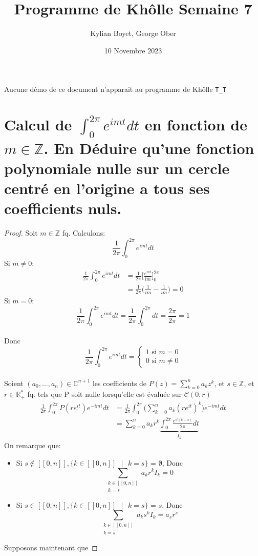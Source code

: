 \documentclass[french]{article}
\title{Programme de Khôlle Semaine 7}
\author{Kylian Boyet, George Ober}
\date{10 Novembre 2023}
\newcommand{\Z}{\mathbb Z}
\newcommand{\C}{\mathbb C}
\newcommand{\R}{\mathbb R}
\begin{document}
\maketitle

Aucune démo de ce document n'apparait au programme de Khôlle \verb|T_T|

\section{Calcul de $\int_0^{2\pi}e^{imt}dt$ en fonction de $m \in \Z$. En Déduire qu'une fonction polynomiale nulle sur un cercle centré en l'origine a tous ses coefficients nuls.}

\begin{proof}
	Soit $m \in \Z$ fq. Calculons:
	$$\frac{1}{2 \pi} \int_0^{2\pi}e^{imt}dt$$
	Si $m \neq 0$:
	\begin{align*}
		\frac{1}{2 \pi} \int_0^{2\pi}e^{imt}dt &= \frac{1}{2 \pi} \Big[ \frac{e^{mt}}{im} \Big]_0^{2\pi}\\
		&= \frac{1}{2 \pi} \Big( \frac{1}{im} - \frac{1}{im} \Big) = 0
	\end{align*}
	Si $m = 0$:
	$$
		\frac{1}{2 \pi} \int_0^{2\pi}e^{imt}dt = \frac{1}{2 \pi} \int_0^{2\pi}dt = \frac{2 \pi}{2 \pi} = 1
	$$
	\\
	Donc $$\frac{1}{2 \pi} \int_0^{2\pi}e^{imt}dt = 
	\begin{cases}
		1 \text{ si } m=0\\
		0 \text{ si } m \neq 0
	\end{cases}
	$$
	\\
	Soient $(a_0, ..., a_n) \in \C^{n+1}$ les coefficients de $P(z) = \sum_{k=0}^n a_k z^k$, et $s\in \Z$, et $r \in \R_+^*$ fq. tels que P soit nulle lorsqu'elle est évaluée sur $\mathscr C(0,r)$
	\begin{align*}
		\frac{1}{2 \pi} \int_0^{2\pi} P(re^{it}) e^{-imt}dt &= \frac{1}{2 \pi} \int_0^{2\pi} \bigg (\sum_{k=0}^n a_k (re^{it})^k \bigg) e^{-imt}dt\\
		&= \sum_{k=0}^n a_k r^k \underbrace{\int_0^{2\pi} \frac{e^{it(k-s)}}{2 \pi} dt}_{I_k}
	\end{align*}
	On remarque que:
	\begin{itemize}
	\item Si $s \notin [[0, n]], \{k \in [[0, n]] \text{ }| \text{ } k = s\}$ = $\emptyset$, Donc $$\sum_{\substack{k \in [[0, n]] \\ k = s}} a_k r^k I_k = 0$$
	\item Si $s \in [[0, n]], \{k \in [[0, n]] \text{ }| \text{ } k = s\}$ = ${s}$, Donc $$\sum_{\substack{k \in [[0, n]] \\ k = s}} a_k s^k I_k = a_s r^s$$
	\end{itemize}
	Supposons maintenant que 
\end{proof}
\end{document}
